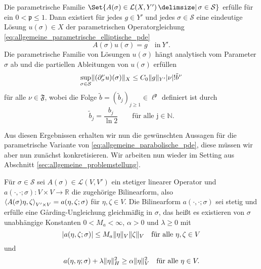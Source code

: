 \begin{Satz}
    \label{thm:kunoth:theorem4}
    Die parametrische Familie $\Set{ A(\sigma) \in \mathcal L(X, Y') \given \sigma \in \mathcal S }$ erfülle  für ein $0 < \mathfrak p \leq 1$.
    Dann existiert für jedes $g \in Y'$ und jedes $\sigma \in \mathcal S$ eine eindeutige Lösung $u(\sigma) \in X$ der parametrischen Operatorgleichung \eqref{eq:allgemeine_parametrische_elliptische_pde}
    \begin{equation}
        A(\sigma) u(\sigma) = g \quad \text{in}~Y'.
    \end{equation}
    Die parametrische Familie von Lösungen $u(\sigma)$ hängt analytisch vom Parameter $\sigma$ ab und die partiellen Ableitungen von $u(\sigma)$ erfüllen
    \begin{equation}
        \label{eq:kunoth:schranke_part_abl}
        \sup_{\sigma \in \mathcal S} \lVert(\partial^{\nu}_{\sigma} u)(\sigma)\rVert_{X} \leq C_{0} \lVert g\rVert_{Y'} \lvert\nu\rvert! \tilde{b}^{\nu}
    \end{equation}
    für alle $\nu \in \mathfrak F$, wobei die Folge $\tilde{b} = (\tilde{b}_{j})_{j \geq 1} \in \ell^{\mathfrak p}$ definiert ist durch
    \begin{equation}
        \tilde{b}_{j} = \frac{b_{j}}{\ln 2} \qquad \text{für alle j} \in \mathbb{N}.
    \end{equation}
\end{Satz}

Aus diesen Ergebnissen erhalten wir nun die gewünschten Aussagen für die parametrische Variante von \eqref{eq:allgemeine_parabolische_pde}, diese müssen wir aber nun zunächst konkretisieren.
Wir arbeiten nun wieder im Setting aus Abschnitt \ref{sec:allgemeine_problemstellung}.

Für $\sigma \in \mathcal S$ sei $A(\sigma) \in \mathcal L(V, V')$ ein stetiger linearer Operator und $a(\cdot, \cdot; \sigma) \colon V \times V \to \mathbb{R}$ die zugehörige Bilinearform, also $\left\langle A(\sigma) \eta,\zeta\right\rangle_{V' \times V} = a(\eta, \zeta; \sigma)$ für $\eta, \zeta \in V$.
Die Bilinearform $a(\cdot, \cdot; \sigma)$ sei stetig und erfülle eine G\aa rding-Ungleichung gleichmäßig in $\sigma$, das heißt es existieren von $\sigma$ unabhängige Konstanten $0 < M_{a} < \infty$, $\alpha > 0$ und $\lambda \geq 0$ mit
\begin{equation}
    \label{eq:allgemeine_parabolische_pde:bf_stetig_parametrisch}
    \lvert a(\eta, \zeta; \sigma)\rvert \leq M_{a} \lVert\eta\rVert_{V} \lVert\zeta\rVert_{V} \quad \text{für alle}~\eta, \zeta \in V
\end{equation}
und
\begin{equation}
    \label{eq:allgemeine_parabolische_pde:bf_garding_parametrisch}
    a(\eta, \eta; \sigma) + \lambda \lVert\eta\rVert_{H}^{2} \geq \alpha \lVert\eta\rVert_{V}^{2} \quad \text{für alle}~\eta \in V.
\end{equation}

